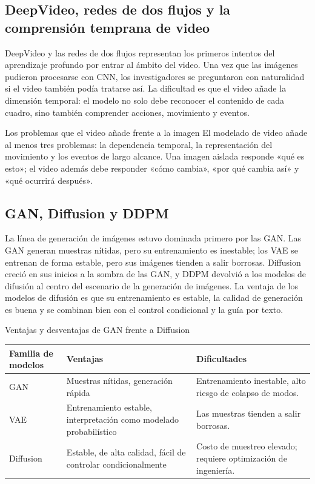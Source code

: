 \documentclass[a4paper]{article}
\begin{document}
\subsection{DeepVideo, redes de dos flujos y la comprensión temprana de video}

DeepVideo y las redes de dos flujos representan los primeros intentos del aprendizaje profundo por entrar al ámbito del video. Una vez que las imágenes pudieron procesarse con CNN, los investigadores se preguntaron con naturalidad si el video también podía tratarse así. La dificultad es que el video añade la dimensión temporal: el modelo no solo debe reconocer el contenido de cada cuadro, sino también comprender acciones, movimiento y eventos.

\begin{importantbox}{Los problemas que el video añade frente a la imagen}
El modelado de video añade al menos tres problemas: la dependencia temporal, la representación del movimiento y los eventos de largo alcance. Una imagen aislada responde «qué es esto»; el video además debe responder «cómo cambia», «por qué cambia así» y «qué ocurrirá después».
\end{importantbox}

\subsection{GAN, Diffusion y DDPM}

La línea de generación de imágenes estuvo dominada primero por las GAN. Las GAN generan muestras nítidas, pero su entrenamiento es inestable; los VAE se entrenan de forma estable, pero sus imágenes tienden a salir borrosas. Diffusion creció en sus inicios a la sombra de las GAN, y DDPM devolvió a los modelos de difusión al centro del escenario de la generación de imágenes. La ventaja de los modelos de difusión es que su entrenamiento es estable, la calidad de generación es buena y se combinan bien con el control condicional y la guía por texto.

\begin{knowledgebox}{Ventajas y desventajas de GAN frente a Diffusion}
\begin{tabularx}{\textwidth}{p{}p{}X}
\toprule
Familia de modelos & Ventajas & Dificultades \\
\midrule
GAN & Muestras nítidas, generación rápida & Entrenamiento inestable, alto riesgo de colapso de modos. \\
VAE & Entrenamiento estable, interpretación como modelado probabilístico & Las muestras tienden a salir borrosas. \\
Diffusion & Estable, de alta calidad, fácil de controlar condicionalmente & Costo de muestreo elevado; requiere optimización de ingeniería. \\
\bottomrule
\end{tabularx}
\end{knowledgebox}
\end{document}
